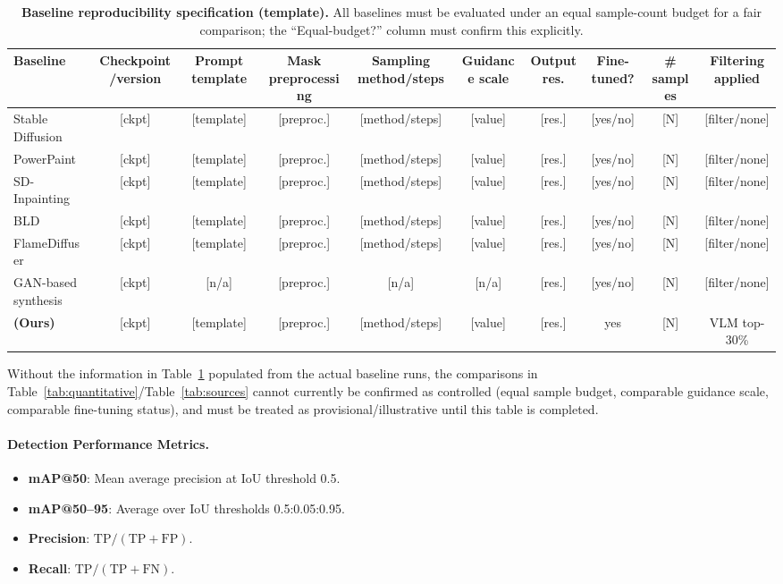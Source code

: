 \documentclass[journal]{IEEEtran}
\begin{document}
\begin{table}[t]
\centering
\caption{\textbf{Baseline reproducibility specification (template).} All
baselines must be evaluated under an equal sample-count budget for a fair
comparison; the ``Equal-budget?'' column must confirm this explicitly.}
\label{tab:baseline_repro}
\small
\begin{tabular}{lccccccccc}
\toprule
Baseline & Checkpoint/version & Prompt template & Mask preprocessing & Sampling method/steps & Guidance scale & Output res. & Fine-tuned? & \# samples & Filtering applied \\
\midrule
Stable Diffusion \cite{rombach2022highresolutionimagesynthesislatent} & [ckpt] & [template] & [preproc.] & [method/steps] & [value] & [res.] & [yes/no] & [N] & [filter/none] \\
PowerPaint \cite{zhuang2024taskworthwordlearning} & [ckpt] & [template] & [preproc.] & [method/steps] & [value] & [res.] & [yes/no] & [N] & [filter/none] \\
SD-Inpainting & [ckpt] & [template] & [preproc.] & [method/steps] & [value] & [res.] & [yes/no] & [N] & [filter/none] \\
BLD \cite{Avrahami_2023} & [ckpt] & [template] & [preproc.] & [method/steps] & [value] & [res.] & [yes/no] & [N] & [filter/none] \\
FlameDiffuser \cite{wang2024flamediffuserwildfireimage} & [ckpt] & [template] & [preproc.] & [method/steps] & [value] & [res.] & [yes/no] & [N] & [filter/none] \\
GAN-based synthesis \cite{rs12223715} & [ckpt] & [n/a] & [preproc.] & [n/a] & [n/a] & [res.] & [yes/no] & [N] & [filter/none] \\
\textbf{\method{} (Ours)} & [ckpt] & [template] & [preproc.] & [method/steps] & [value] & [res.] & yes & [N] & VLM top-30\% \\
\bottomrule
\end{tabular}
\end{table}

Without the information in Table~\ref{tab:baseline_repro} populated from
the actual baseline runs, the comparisons in
Table~\ref{tab:quantitative}/Table~\ref{tab:sources} cannot currently be
confirmed as controlled (equal sample budget, comparable guidance scale,
comparable fine-tuning status), and must be treated as
provisional/illustrative until this table is completed.

\paragraph{Detection Performance Metrics.}
\begin{itemize}
    \item \textbf{mAP@50}: Mean average precision at IoU threshold 0.5.
    \item \textbf{mAP@50--95}: Average over IoU thresholds 0.5:0.05:0.95.
    \item \textbf{Precision}: $\text{TP}/(\text{TP}+\text{FP})$.
    \item \textbf{Recall}: $\text{TP}/(\text{TP}+\text{FN})$.
\end{itemize}
\end{document}
